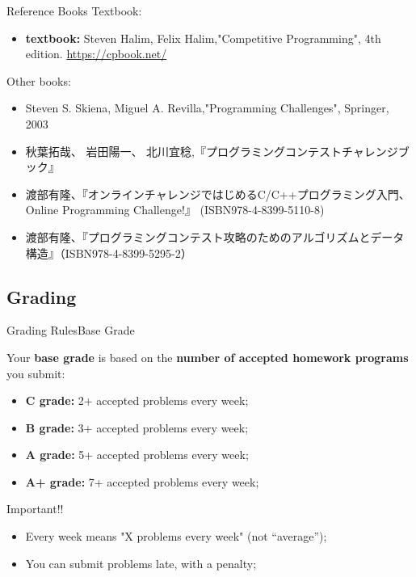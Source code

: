 \begin{frame}{Reference Books}
  Textbook:
  \begin{itemize}
    \item {\bf textbook:} Steven Halim, Felix Halim,"Competitive Programming", 4th edition. \url{https://cpbook.net/}
  \end{itemize}
  \bigskip

  Other books:
  \begin{itemize}
    \item Steven S. Skiena, Miguel A. Revilla,"Programming Challenges", Springer, 2003
    \item 秋葉拓哉、 岩田陽一、 北川宜稔,『プログラミングコンテストチャレンジブック』
    \item 渡部有隆、『オンラインチャレンジではじめるC/C++プログラミング入門、Online Programming Challenge!』 (ISBN978-4-8399-5110-8)
    \item 渡部有隆、『プログラミングコンテスト攻略のためのアルゴリズムとデータ構造』（ISBN978-4-8399-5295-2）
  \end{itemize}
\end{frame}

\subsection{Grading}
\begin{frame}{Grading Rules}{Base Grade}

  Your {\bf base grade} is based on the {\bf number of accepted homework programs} you submit:

  \begin{itemize}
    \item {\bf C grade:} 2+ accepted problems every week;
    \item {\bf B grade:} 3+ accepted problems every week;
    \item {\bf A grade:} 5+ accepted problems every week;
    \item {\bf A+ grade:} 7+ accepted problems every week;
  \end{itemize}\bigskip

  \begin{alertblock}{Important!!}
    \begin{itemize}
      \item Every week means "X problems every week" (not ``average'');
      \item You can submit problems late, with a penalty;
    \end{itemize}
  \end{alertblock}
\end{frame}

